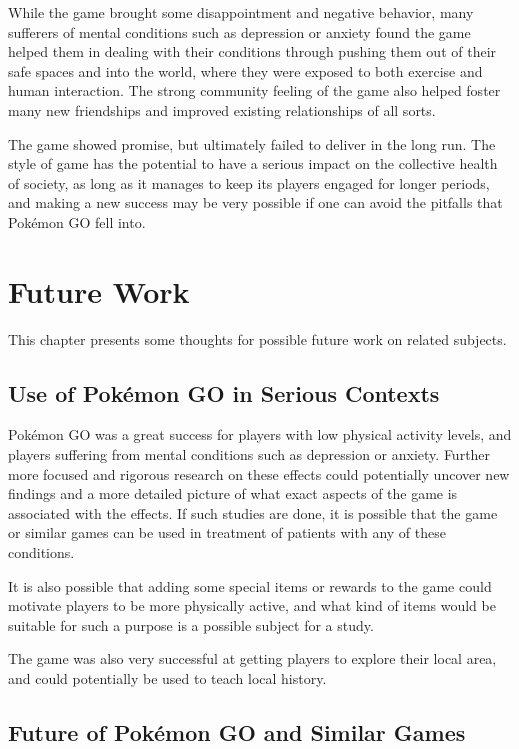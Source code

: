 While the game brought some disappointment and negative behavior, many sufferers of mental conditions such as depression or anxiety found the game helped them in dealing with their conditions through pushing them out of their safe spaces and into the world, where they were exposed to both exercise and human interaction. The strong community feeling of the game also helped foster many new friendships and improved existing relationships of all sorts.

The game showed promise, but ultimately failed to deliver in the long run. The style of game has the potential to have a serious impact on the collective health of society, as long as it manages to keep its players engaged for longer periods, and making a new success may be very possible if one can avoid the pitfalls that Pokémon GO fell into.


\chapter{Future Work}
This chapter presents some thoughts for possible future work on related subjects.

\section{Use of Pokémon GO in Serious Contexts}
Pokémon GO was a great success for players with low physical activity levels, and players suffering from mental conditions such as depression or anxiety. Further more focused and rigorous research on these effects could potentially uncover new findings and a more detailed picture of what exact aspects of the game is associated with the effects. If such studies are done, it is possible that the game or similar games can be used in treatment of patients with any of these conditions.

It is also possible that adding some special items or rewards to the game could motivate players to be more physically active, and what kind of items would be suitable for such a purpose is a possible subject for a study.

The game was also very successful at getting players to explore their local area, and could potentially be used to teach local history.

\section{Future of Pokémon GO and Similar Games}

